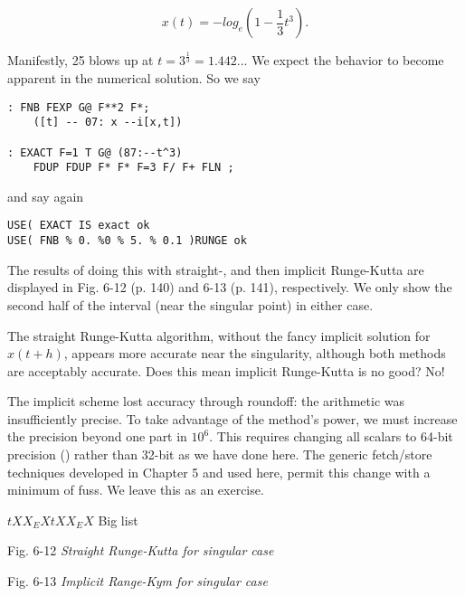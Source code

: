 \begin{equation}
x(t) = -log_e(1-\frac{1}{3}t^3).
\end{equation}

Manifestly, 25 blows up at $t = 3^\frac{1}{3}=1.442...$ We expect the behavior to become apparent in the numerical solution. So we say

\begin{lstlisting}
: FNB FEXP G@ F**2 F*;
    ([t] -- 07: x --i[x,t])

: EXACT F=1 T G@ (87:--t^3)
    FDUP FDUP F* F* F=3 F/ F+ FLN ;
\end{lstlisting}

and say again
\begin{lstlisting}
USE( EXACT IS exact ok
USE( FNB % 0. %0 % 5. % 0.1 )RUNGE ok
\end{lstlisting}

The results of doing this with straight-, and then implicit Runge-Kutta are displayed in Fig. 6-12 (p. 140) and 6-13 (p. 141), respectively. We only show the second half of the interval (near the singular point) in either case.

The straight Runge-Kutta algorithm, without the fancy implicit solution for $x(t +h)$, appears more accurate near the singularity, although both methods are acceptably accurate. Does this mean implicit Runge-Kutta is no good? No!

The implicit scheme lost accuracy through roundoff: the arithmetic was insufficiently precise. To take advantage of the method’s power, we must increase the precision beyond one part in $10^{6}$. This requires changing all scalars to 64-bit precision () rather than 32-bit as we have done here. The generic fetch/store techniques developed in Chapter 5 and used here, permit this change with a minimum of fuss. We leave this as an exercise.

$t X X_EX t X X_EX$
Big list

Fig. 6-12 \textit{Straight Runge-Kutta for singular case}

Fig. 6-13 \textit{Implicit Range-Kym for singular case}

